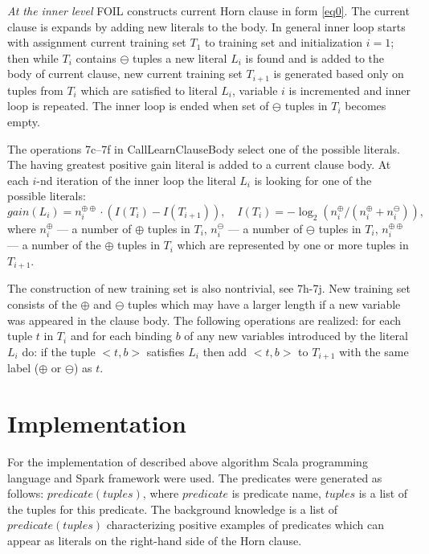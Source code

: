 \documentclass{scrartcl}
\begin{document}
\emph{At the inner level} FOIL constructs current Horn clause in form \eqref{eq0}.
The current clause is expands by adding new literals to the body.
In general inner loop starts with assignment current training set $T_1$
to training set and  initialization $i = 1$;
then while $T_i$ contains $\ominus$ tuples a new literal $L_i$ is found
and is added to the body of current clause,
new current training set $T_{i+1}$ is generated based only on
 tuples from $T_i$ which are satisfied to literal $L_i$,
 variable $i$ is incremented and inner loop is repeated.
 The inner loop is ended when set of $\ominus$ tuples in $T_i$ becomes empty.


The operations 7c--7f in
 CallLearnClauseBody
select one of the possible literals.
The having greatest positive gain literal is added to a current clause body.
At each $i$-nd iteration of the inner loop the literal $L_{i}$
 is looking for one of the possible literals:
 \begin{equation}\label{eq4}
gain (L_{i})=n_i^{\oplus\oplus} \cdot (I(T_i)-I(T_{i+1})),\quad
I(T_i)=-\log_2 (n_i^\oplus/(n_i^\oplus+n_i^\ominus)),
\end{equation}
where $n_i^\oplus$ --- a number of $\oplus$ tuples in $T_i$,
$n_i^\ominus$ --- a number of $\ominus$ tuples in $T_i$,
$n_i^{\oplus\oplus}$ --- a number of the $\oplus$ tuples in $T_i$
 which  are represented by one or more tuples in $T_{i+1}$.

The construction of new training set is also nontrivial, see 7h-7j.
New training set consists of
 the $\oplus$ and $\ominus$ tuples which may have a larger length
if a new variable was appeared in the clause body.
The following operations are realized: for each tuple $t$ in $T_i$ and for each binding $b$ of any new variables
introduced by the literal $L_i$ do:
if the tuple $<t,b>$ satisfies $L_i$
then add $<t,b>$ to $T_{i+1}$
with the same label ($\oplus$ or $\ominus$) as $t$.



\section{Implementation}

For the implementation of described above algorithm Scala programming language and Spark framework were used.
The predicates were generated as follows: $predicate(tuples)$, where $predicate$ is predicate name, $tuples$ is a list of the tuples for this predicate. The background knowledge is a list of $predicate(tuples)$ characterizing positive examples of predicates which can appear as literals on the right-hand side of the Horn clause.
\end{document}

